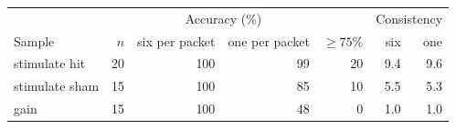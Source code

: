\begin{tabular}{@{}lrrrrrr@{}}\toprule & & \multicolumn{2}{c}{Accuracy (\%)} & & \multicolumn{2}{c}{Consistency} \\
Sample & $n$ & six per packet & one per packet & $\geq 75\%$ & six & one \\ \midrule
stimulate hit & 20 & 100 & 99 & 20 & 9.4 & 9.6 \\
stimulate sham & 15 & 100 & 85 & 10 & 5.5 & 5.3 \\
gain & 15 & 100 & 48 & 0 & 1.0 & 1.0 \\
\bottomrule\end{tabular}
